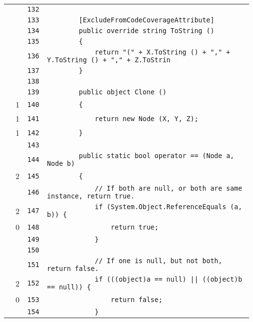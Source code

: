 \documentclass[a4paper,10pt]{article}
\begin{document}
\begin{longtable}[l]{lrrl}
\cellcolor{gray} &  & \verb~132~ & \verb~~\\
\cellcolor{gray} &  & \verb~133~ & \verb~        [ExcludeFromCodeCoverageAttribute]~\\
\cellcolor{gray} &  & \verb~134~ & \verb~        public override string ToString ()~\\
\cellcolor{gray} &  & \verb~135~ & \verb~        {~\\
\cellcolor{gray} &  & \verb~136~ & \verb~            return "(" + X.ToString () + "," + Y.ToString () + "," + Z.ToStrin~\\
\cellcolor{gray} &  & \verb~137~ & \verb~        }~\\
\cellcolor{gray} &  & \verb~138~ & \verb~~\\
\cellcolor{gray} &  & \verb~139~ & \verb~        public object Clone ()~\\
\cellcolor{green} & 1 & \verb~140~ & \verb~        {~\\
\cellcolor{green} & 1 & \verb~141~ & \verb~            return new Node (X, Y, Z);~\\
\cellcolor{green} & 1 & \verb~142~ & \verb~        }~\\
\cellcolor{gray} &  & \verb~143~ & \verb~~\\
\cellcolor{gray} &  & \verb~144~ & \verb~        public static bool operator == (Node a, Node b)~\\
\cellcolor{green} & 2 & \verb~145~ & \verb~        {~\\
\cellcolor{gray} &  & \verb~146~ & \verb~            // If both are null, or both are same instance, return true.~\\
\cellcolor{green} & 2 & \verb~147~ & \verb~            if (System.Object.ReferenceEquals (a, b)) {~\\
\cellcolor{red} & 0 & \verb~148~ & \verb~                return true;~\\
\cellcolor{gray} &  & \verb~149~ & \verb~            }~\\
\cellcolor{gray} &  & \verb~150~ & \verb~~\\
\cellcolor{gray} &  & \verb~151~ & \verb~            // If one is null, but not both, return false.~\\
\cellcolor{green} & 2 & \verb~152~ & \verb~            if (((object)a == null) || ((object)b == null)) {~\\
\cellcolor{red} & 0 & \verb~153~ & \verb~                return false;~\\
\cellcolor{gray} &  & \verb~154~ & \verb~            }~\\

\end{longtable}
\end{document}
